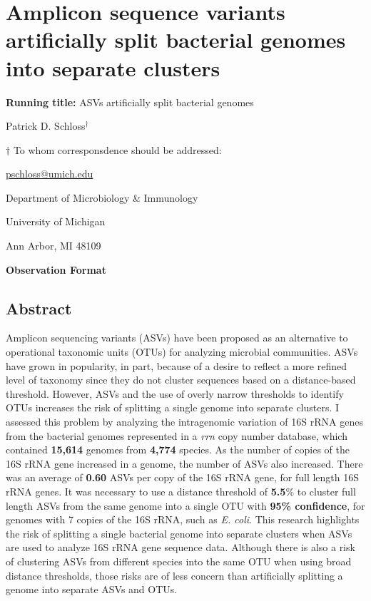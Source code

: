 \documentclass[
]{article}
\author{}
\date{\vspace{-2.5em}}
\begin{document}
\hypertarget{amplicon-sequence-variants-artificially-split-bacterial-genomes-into-separate-clusters}{%
\section{Amplicon sequence variants artificially split bacterial genomes
into separate
clusters}\label{amplicon-sequence-variants-artificially-split-bacterial-genomes-into-separate-clusters}}

\vspace{20mm}

\textbf{Running title:} ASVs artificially split bacterial genomes

\vspace{20mm}

Patrick D. Schloss\({^\dagger}\)

\vspace{40mm}

\({\dagger}\) To whom corresponsdence should be addressed:

\href{mailto:pschloss@umich.edu}{pschloss@umich.edu}

Department of Microbiology \& Immunology

University of Michigan

Ann Arbor, MI 48109

\vspace{20mm}

\textbf{Observation Format}

\newpage

\hypertarget{abstract}{%
\subsection{Abstract}\label{abstract}}

Amplicon sequencing variants (ASVs) have been proposed as an alternative
to operational taxonomic units (OTUs) for analyzing microbial
communities. ASVs have grown in popularity, in part, because of a desire
to reflect a more refined level of taxonomy since they do not cluster
sequences based on a distance-based threshold. However, ASVs and the use
of overly narrow thresholds to identify OTUs increases the risk of
splitting a single genome into separate clusters. I assessed this
problem by analyzing the intragenomic variation of 16S rRNA genes from
the bacterial genomes represented in a \emph{rrn} copy number database,
which contained \textbf{15,614} genomes from \textbf{4,774} species. As
the number of copies of the 16S rRNA gene increased in a genome, the
number of ASVs also increased. There was an average of \textbf{0.60}
ASVs per copy of the 16S rRNA gene, for full length 16S rRNA genes. It
was necessary to use a distance threshold of \textbf{5.5}\% to cluster
full length ASVs from the same genome into a single OTU with
\textbf{95\% confidence}, for genomes with 7 copies of the 16S rRNA,
such as \emph{E. coli}. This research highlights the risk of splitting a
single bacterial genome into separate clusters when ASVs are used to
analyze 16S rRNA gene sequence data. Although there is also a risk of
clustering ASVs from different species into the same OTU when using
broad distance thresholds, those risks are of less concern than
artificially splitting a genome into separate ASVs and OTUs.
\end{document}
